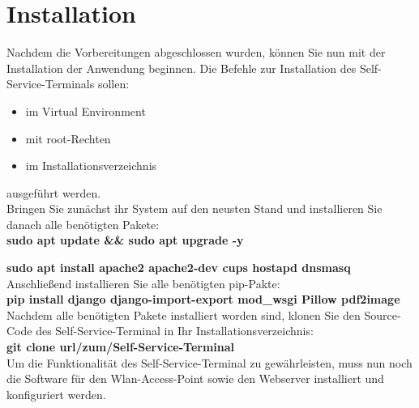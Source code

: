 \section{Installation}
Nachdem die Vorbereitungen abgeschlossen wurden, können Sie nun mit der Installation der Anwendung beginnen. Die Befehle zur Installation des Self-Service-Terminals sollen:

\begin{itemize}
    \item im Virtual Environment
    \item mit root-Rechten
    \item im Installationsverzeichnis
\end{itemize}

\noindent ausgeführt werden.\\

\noindent Bringen Sie zunächst ihr System auf den neusten Stand und installieren Sie danach alle benötigten Pakete:\\

\textbf{sudo apt update \&\& sudo apt upgrade -y}\par
\textbf{sudo apt install apache2 apache2-dev cups hostapd dnsmasq}\\

\noindent Anschließend installieren Sie alle benötigten pip-Pakte:\\

\textbf{pip install django django-import-export mod\_wsgi Pillow pdf2image}\\

\noindent Nachdem alle benötigten Pakete installiert worden sind, klonen Sie den Source-Code des Self-Service-Terminal in Ihr Installationsverzeichnis:\\

\textbf{git clone url/zum/Self-Service-Terminal}\\

\noindent Um die Funktionalität des Self-Service-Terminal zu gewährleisten, muss nun noch die Software für den Wlan-Access-Point sowie den Webserver installiert und konfiguriert werden.